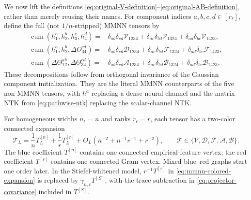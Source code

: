 \documentclass{article}
\newcommand{\cum}{\operatorname{cum}}
\begin{document}
We now lift the definitions
\eqref{eq:original-V-definition}--\eqref{eq:original-AB-definition}, rather
than merely reusing their names.  For component indices \(a,b,c,d\in[r_\ell]\),
define the full (not \(1/n\)-stripped) MMNN tensors by
\begin{align}
\cum(h^a_1,h^b_2,h^c_3,h^d_4)
={}&\delta_{ab}\delta_{cd}\mathcal V_{1234}
+\delta_{ac}\delta_{bd}\mathcal V_{1324}
+\delta_{ad}\delta_{bc}\mathcal V_{1423},
\label{eq:mmnn-V-definition}\\
\cum(h^a_1,h^b_2,\Delta\Theta^{cd}_{34})
={}&\delta_{ab}\delta_{cd}\mathcal D_{1234}
+\delta_{ac}\delta_{bd}\mathcal F_{1324}
+\delta_{ad}\delta_{bc}\mathcal F_{1423},
\label{eq:mmnn-DF-definition}\\
\cum(\Delta\Theta^{ab}_{12},\Delta\Theta^{cd}_{34})
={}&\delta_{ab}\delta_{cd}\mathcal A_{1234}
+\delta_{ac}\delta_{bd}\mathcal B_{1324}
+\delta_{ad}\delta_{bc}\mathcal B_{1423}.
\label{eq:mmnn-AB-definition}
\end{align}
These decompositions follow from orthogonal invariance of the Gaussian
component initialization.  They are the literal MMNN counterparts of the
five non-MMNN tensors, with \(h^a\) replacing a dense neural channel and the
matrix NTK from \eqref{eq:pathwise-ntk} replacing the scalar-channel NTK.

For homogeneous widths \(n_\ell=n\) and ranks \(r_\ell=r\), each tensor has a
two-color connected expansion
\begin{equation}
\mathcal T_L=\frac1nT_L^{[n]}+\frac1rT_L^{[r]}
+O_{L}(n^{-2}+n^{-1}r^{-1}+r^{-2}),
\qquad
\mathcal T\in\{\mathcal V,\mathcal D,\mathcal F,\mathcal A,\mathcal B\}.
\label{eq:mmnn-colored-expansion}
\end{equation}
The blue coefficient \(T^{[n]}\) contains one connected empirical-feature
vertex; the red coefficient \(T^{[r]}\) contains one connected Gram vertex.
Mixed blue--red graphs start one order later.  In the Stiefel-whitened model,
\(r^{-1}T^{[r]}\) in \eqref{eq:mmnn-colored-expansion} is replaced by
\(\gamma_{n,r}T^{[S]}\), with the trace subtraction in
\eqref{eq:projector-covariance} included in \(T^{[S]}\).
\end{document}
